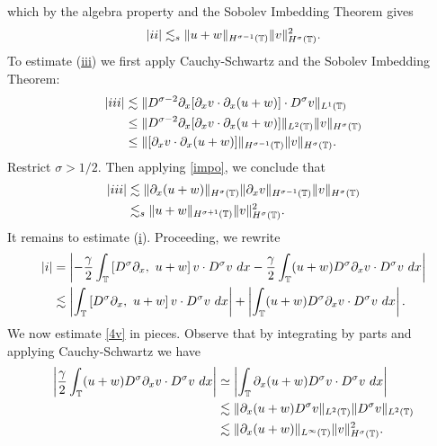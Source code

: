 which by the algebra property and the Sobolev
Imbedding Theorem gives
\begin{equation}
\begin{split}
    |ii| \lesssim_{s} \|u+w\|_{H^{\sigma -1}(\mathbb{T})} \|v\|_{H^\sigma(\mathbb{T})}^2.
\label{3v}
\end{split}
\end{equation}
To estimate (\hyperref[2v]{iii}) we first apply
Cauchy-Schwartz and the Sobolev Imbedding Theorem:
\begin{equation*}
\begin{split}
|iii| & \lesssim  \|D^{\sigma -2} \partial_x
[\partial_x v \cdot \partial_x (u+w)] \cdot D^\sigma v  \|_{L^1(\mathbb{T})} 
\\
& \le   \|D^{\sigma -2} \partial_x
[\partial_x v \cdot \partial_x (u+w)] \|_{L^2(\mathbb{T})}
\|v\|_{H^\sigma(\mathbb{T})}
\\
& \le 
\|[\partial_x v \cdot \partial_x (u+w)] \|_{H^{\sigma -1}(\mathbb{T})}
\|v\|_{H^\sigma(\mathbb{T})}.
\end{split}
\end{equation*}
Restrict $\sigma > 1/2$. Then applying \eqref{impo}, we conclude
that
\begin{equation}
\begin{split}
|iii|
& \lesssim 
\|\partial_x(u+w) \|_{H^{\sigma}(\mathbb{T})}
\|\partial_x v\|_{H^{\sigma -1}(\mathbb{T})} \|v\|_{H^\sigma(\mathbb{T})}
\\
& \lesssim_{s} \|u+w \|_{H^{\sigma + 1}(\mathbb{T})}
\|v\|_{H^\sigma(\mathbb{T})}^2.
\label{3'v}
\end{split}
\end{equation}
It remains to estimate (\hyperref[2v]{i}).
Proceeding, we rewrite
\begin{equation}
\begin{split}
|i| & =
\left |
-\frac{\gamma}{2} \int_{\mathbb{T}} \left[ D^\sigma \partial_x, \ u+w \right]v \cdot
D^\sigma v \ dx - \frac{\gamma}{2} \int_{\mathbb{T}} (u+w) D^\sigma
\partial_x v \cdot D^\sigma v\ dx
\right | 
\\
& \lesssim \left |  \int_{\mathbb{T}} \left[ D^\sigma \partial_x, \ u+w \right]v \cdot
D^\sigma v \ dx \right |
+ \left |  \int_{\mathbb{T}} (u+w) D^\sigma \partial_x v
\cdot D^\sigma v\
dx \right |.
\label{4v}
\end{split}
\end{equation}
We now estimate \eqref{4v} in pieces. Observe that by integrating by parts
and applying Cauchy-Schwartz we have
\begin{equation}
\begin{split}
\left | \frac{\gamma}{2}\int_{\mathbb{T}} (u+w) D^\sigma \partial_x v \cdot
D^\sigma v \ dx \right |
& \simeq \left |  \int_{\mathbb{T}} \partial_x (u+w) D^\sigma v
\cdot D^\sigma v \ dx \right |
\\
& \lesssim \|\partial_x (u+w) D^\sigma v \|_{L^2(\mathbb{T})} \|D^\sigma
v\|_{L^2(\mathbb{T})}
\\
& \lesssim \|\partial_x (u+w)\|_{L^\infty(\mathbb{T})}
\|v\|_{H^\sigma(\mathbb{T})}^2.
\label{4'v}
\end{split}
\end{equation}
